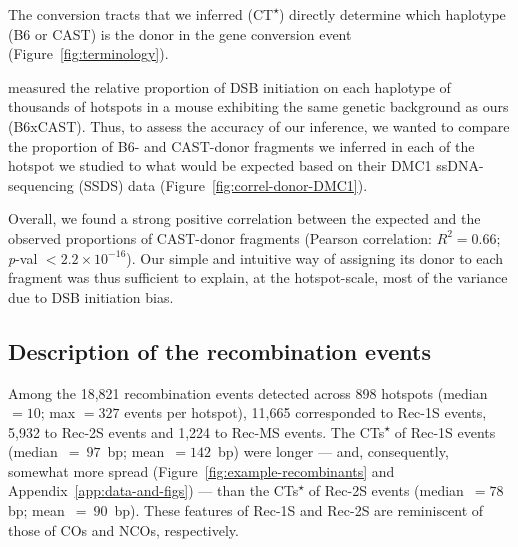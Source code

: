 The conversion tracts that we inferred (CT\textsuperscript{$\star$}) directly determine which haplotype (B6 or CAST) is the donor in the gene conversion event (Figure~\ref{fig:terminology}).

\citet{smagulova2016evolutionary} measured the relative proportion of DSB initiation on each haplotype of thousands of hotspots in a mouse exhibiting the same genetic background as ours (B6xCAST).
Thus, to assess the accuracy of our inference, we wanted to compare the proportion of B6- and CAST-donor fragments we inferred in each of the hotspot we studied to what would be expected based on their DMC1 ssDNA-sequencing (SSDS) data (Figure~\ref{fig:correl-donor-DMC1}).

Overall, we found a strong positive correlation between the expected and the observed proportions of CAST-donor fragments (Pearson correlation: $R^2 = 0.66$; {\textit{p}-val $< 2.2 \times 10^{-16}$}).
Our simple and intuitive way of assigning its donor to each fragment was thus sufficient to explain, at the hotspot-scale, most of the variance due to DSB initiation bias.



\subsection{Description of the recombination events} 

Among the 18,821 recombination events detected across 898 hotspots (median~$= 10$; max $= 327$ events per hotspot), 11,665 corresponded to Rec-1S events, 5,932 to Rec-2S events and 1,224 to Rec-MS events.
The CTs\textsuperscript{$\star$} of Rec-1S events (median~$=~97$~bp; mean~$= 142$~bp) were longer — and, consequently, somewhat more spread (Figure~\ref{fig:example-recombinants} and Appendix~\ref{app:data-and-figs}) — than the CTs\textsuperscript{$\star$} of Rec-2S events (median~$= 78$ bp; mean~$=~90$~bp).
These features of Rec-1S and Rec-2S are reminiscent of those of COs and NCOs, respectively.



